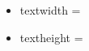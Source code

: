\documentclass{basic}
\begin{document}
	\begin{itemize}
		\item textwidth = \the\textwidth
		\item textheight = \the\textheight
	\end{itemize}
\end{document}
